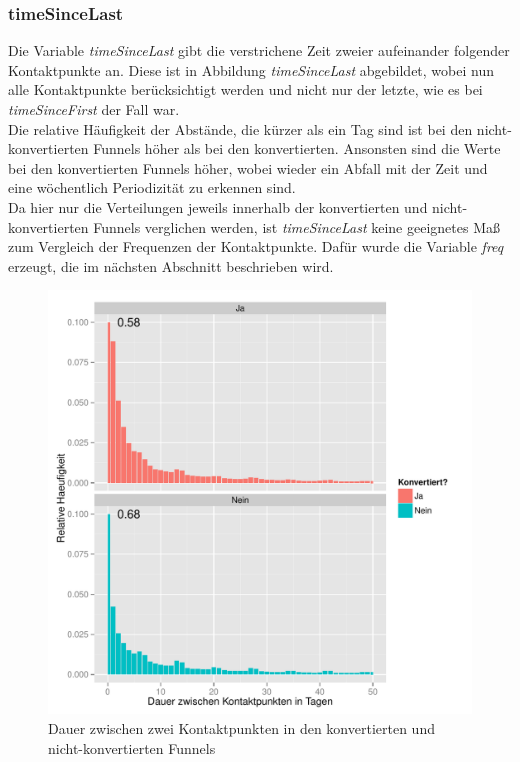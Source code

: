 \subsubsection*{timeSinceLast}
Die Variable \textit{timeSinceLast} gibt die verstrichene Zeit zweier aufeinander folgender Kontaktpunkte an. Diese ist in Abbildung \textit{timeSinceLast} abgebildet, wobei nun alle Kontaktpunkte berücksichtigt werden und nicht nur der letzte, wie es bei \textit{timeSinceFirst} der Fall war.\\
Die relative Häufigkeit der Abstände, die kürzer als ein Tag sind ist bei den nicht-konvertierten Funnels höher als bei den konvertierten. Ansonsten sind die Werte bei den konvertierten Funnels höher, wobei wieder ein Abfall mit der Zeit und eine wöchentlich Periodizität zu erkennen sind.\\
Da hier nur die Verteilungen jeweils innerhalb der konvertierten und nicht-konvertierten Funnels verglichen werden, ist \textit{timeSinceLast} keine geeignetes Maß zum Vergleich der Frequenzen der Kontaktpunkte. Dafür wurde die Variable \textit{freq} erzeugt, die im nächsten Abschnitt beschrieben wird.
\begin{figure}[H]
    \centering
    \includegraphics[scale=0.5]{timeSinceLast.pdf}
    \caption{Dauer zwischen zwei Kontaktpunkten in den konvertierten und nicht-konvertierten Funnels}
    \label{timeSinceLast}
\end{figure}

